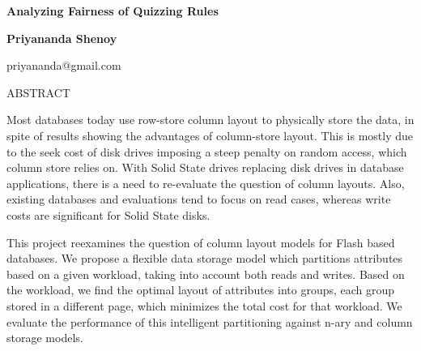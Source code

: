 \documentclass[10pt]{article}
\begin{document}
\centerline{{\large {\bf Analyzing Fairness of Quizzing Rules}}}
\vspace{6pt}
\centerline{{\bf Priyananda Shenoy}}
\vspace{6pt}
\centerline{ priyananda@gmail.com }
\vspace{6pt}
\centerline{ ABSTRACT }

Most databases today use row-store column layout to physically store the data,
in spite of results showing the advantages of column-store layout. This is mostly
due to the seek cost of disk drives imposing a steep penalty on random access,
which column store relies on. With Solid State drives replacing disk drives
in database applications, there is a need to re-evaluate the question of
column layouts. Also, existing databases and evaluations tend to focus on read
cases, whereas write costs are significant for Solid State disks.

This project reexamines the question of column layout models for Flash based
databases. We propose a flexible data storage model which partitions attributes
based on a given workload, taking into account both reads and writes. Based on
the workload, we find the optimal layout of attributes into groups, each group
stored in a different page, which minimizes the total cost for that workload.
We evaluate the performance of this intelligent partitioning against n-ary and
column storage models.
\end{document}
